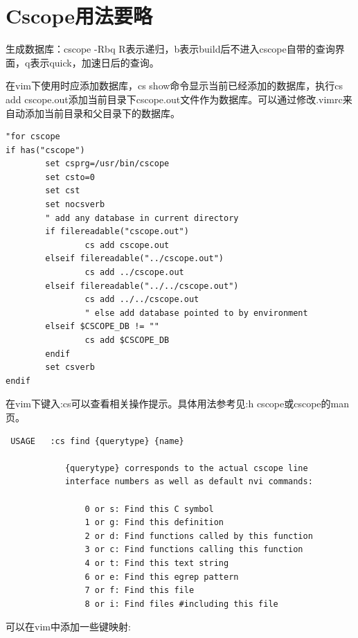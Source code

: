 \section{Cscope用法要略}

生成数据库：cscope -Rbq 
R表示递归，b表示build后不进入cscope自带的查询界面，q表示quick，加速日后的查询。

在vim下使用时应添加数据库，cs show命令显示当前已经添加的数据库，执行cs add cscope.out添加当前目录下cscope.out文件作为数据库。可以通过修改.vimrc来自动添加当前目录和父目录下的数据库。

\begin{verbatim}
"for cscope
if has("cscope")
        set csprg=/usr/bin/cscope
        set csto=0
        set cst 
        set nocsverb
        " add any database in current directory
        if filereadable("cscope.out")
                cs add cscope.out
        elseif filereadable("../cscope.out")
                cs add ../cscope.out
        elseif filereadable("../../cscope.out")
                cs add ../../cscope.out
                " else add database pointed to by environment
        elseif $CSCOPE_DB != ""
                cs add $CSCOPE_DB
        endif
        set csverb
endif

\end{verbatim}

在vim下键入:cs可以查看相关操作提示。具体用法参考见:h cscope或cscope的man页。

\begin{verbatim}
 USAGE   :cs find {querytype} {name}

            {querytype} corresponds to the actual cscope line
            interface numbers as well as default nvi commands:

                0 or s: Find this C symbol
                1 or g: Find this definition
                2 or d: Find functions called by this function
                3 or c: Find functions calling this function
                4 or t: Find this text string
                6 or e: Find this egrep pattern
                7 or f: Find this file
                8 or i: Find files #including this file

\end{verbatim}

可以在vim中添加一些键映射:

